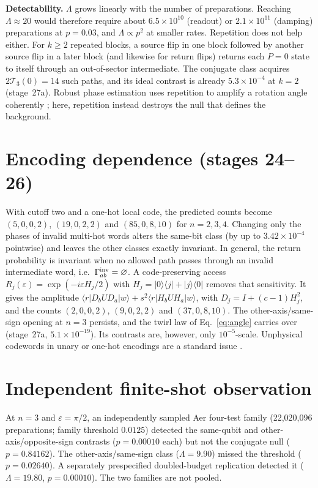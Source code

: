 \documentclass[11pt,a4paper]{article}
\newcommand{\T}{\mathcal T}
\begin{document}
\textbf{Detectability.} $\Lambda$ grows linearly with the number of preparations. Reaching $\Lambda\approx20$ would therefore require about $6.5\times10^{10}$ (readout) or $2.1\times10^{11}$ (damping) preparations at $p=0.03$, and $\Lambda\propto p^2$ at smaller rates. Repetition does not help either. For $k\ge2$ repeated blocks, a source flip in one block followed by another source flip in a later block (and likewise for return flips) returns each $P=0$ state to itself through an out-of-sector intermediate. The conjugate class acquires $2\T_3(0)=14$ such paths, and its ideal contrast is already $5.3\times10^{-4}$ at $k=2$ (stage~27a). Robust phase estimation uses repetition to amplify a rotation angle coherently \cite{kimmel2015}; here, repetition instead destroys the null that defines the background.

\section*{Encoding dependence (stages 24--26)}
With cutoff two and a one-hot local code, the predicted counts become $(5,0,0,2)$, $(19,0,2,2)$ and $(85,0,8,10)$ for $n=2,3,4$. Changing only the phases of invalid multi-hot words alters the same-bit class (by up to $3.42\times10^{-4}$ pointwise) and leaves the other classes exactly invariant. In general, the return probability is invariant when no allowed path passes through an invalid intermediate word, i.e.\ $\Gamma^{\rm inv}_{ab}=\varnothing$. A code-preserving access $R_j(\varepsilon)=\exp(-i\varepsilon H_j/2)$ with $H_j=|0\rangle\langle j|+|j\rangle\langle0|$ removes that sensitivity. It gives the amplitude $\langle r|D_bUD_a|w\rangle+s^2\langle r|H_bUH_a|w\rangle$, with $D_j=I+(c-1)H_j^2$, and the counts $(2,0,0,2)$, $(9,0,2,2)$ and $(37,0,8,10)$. The other-axis/same-sign opening at $n=3$ persists, and the twirl law of Eq.~\eqref{eq:angle} carries over (stage~27a, $5.1\times10^{-19}$). Its contrasts are, however, only $10^{-5}$-scale. Unphysical codewords in unary or one-hot encodings are a standard issue \cite{sawaya2020,lotstedt2025,lamm2020}.

\section*{Independent finite-shot observation}
At $n=3$ and $\varepsilon=\pi/2$, an independently sampled Aer four-test family (22,020,096 preparations; family threshold $0.0125$) detected the same-qubit and other-axis/opposite-sign contrasts ($p=0.00010$ each) but not the conjugate null ($p=0.84162$). The other-axis/same-sign class ($\Lambda=9.90$) missed the threshold ($p=0.02640$). A separately prespecified doubled-budget replication detected it ($\Lambda=19.80$, $p=0.00010$). The two families are not pooled.
\end{document}

